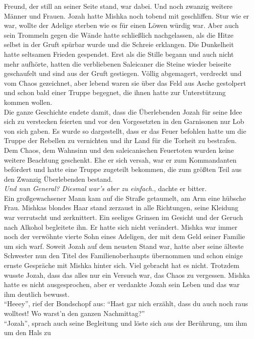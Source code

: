 Freund, der still an seiner Seite stand, war dabei. Und noch zwanzig weitere Männer und Frauen. 
Jozah hatte Mishka noch tobend mit geschliffen. Stur wie er war, wollte der Adelige sterben wie es 
für einen Löwen würdig war. Aber auch sein Trommeln gegen die Wände hatte schließlich nachgelassen, 
als die Hitze selbst in der Gruft spürbar wurde und die Schreie erklangen. Die Dunkelheit hatte 
seltsamen Frieden gespendet. Erst als die Stille begann und auch nicht mehr aufhörte, hatten die 
verbliebenen Saleicaner die Steine wieder beiseite geschaufelt und sind aus der Gruft gestiegen. 
Völlig abgemagert, verdreckt und vom Chaos gezeichnet, aber lebend waren sie über das Feld aus 
Asche gestolpert und schon bald einer Truppe begegnet, die ihnen hatte zur Unterstützung kommen 
wollen.\\
Die ganze Geschichte endete damit, dass die Überlebenden Jozah für seine Idee sich zu verstecken 
feierten und vor den Vorgesetzten in den Garnisonen nur Lob von sich gaben. Es wurde so 
dargestellt, dass er das Feuer befohlen hatte um die Truppe der Rebellen zu vernichten und ihr Land 
für die Torheit zu bestrafen. Dem Chaos, dem Wahnsinn und den saleicanischen Feuertoten wurden 
keine weitere Beachtung geschenkt. Ehe er sich versah, war er zum Kommandanten befördert und hatte 
eine Truppe zugeteilt bekommen, die zum größten Teil aus den Zwanzig Überlebenden bestand.\\
\textit{Und nun General? Diesmal war's aber zu einfach.}, dachte er bitter.\\
Ein großgewachsener Mann kam auf die Straße getaumelt, am Arm eine hübsche Frau. Mishkas blondes 
Haar stand zerzaust in alle Richtungen, seine Kleidung war verrutscht und zerknittert. Ein seeliges 
Grinsen im Gesicht und der Geruch nach Alkohol begleitete ihn. Er hatte sich nicht verändert. 
Mishka war immer noch der verwöhnte vierte Sohn eines Adeligen, der mit dem Geld seiner Familie um 
sich warf. Soweit Jozah auf dem neusten Stand war, hatte aber seine älteste Schwester nun den Titel 
des Familienoberhaupts übernommen und schon einige ernste Gespräche mit Mishka hinter sich. Viel 
gebracht hat es nicht. Trotzdem wusste Jozah, dass das alles nur ein Versuch war, das Chaos 
zu vergessen. Mishka hatte es nicht ausgesprochen, aber er verdankte Jozah sein Leben und das war 
ihm deutlich bewusst.\\
``Heeey'', rief der Bondschopf aus: ``Hast gar nich erzählt, dass du auch noch raus wolltest! Wo 
warst'n den ganzen Nachmittag?''\\
``Jozah'', sprach auch seine Begleitung und löste sich aus der Berührung, um ihm um den Hals zu 
